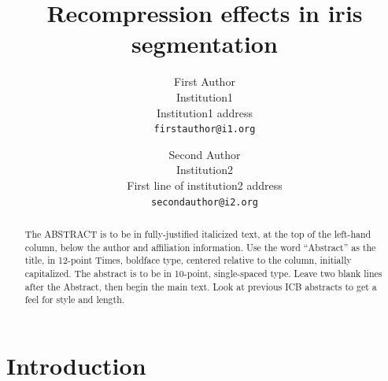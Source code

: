 \documentclass[10pt,twocolumn,letterpaper]{article}
\begin{document}
\title{Recompression effects in iris segmentation}

\author{First Author\\
Institution1\\
Institution1 address\\
{\tt\small firstauthor@i1.org}
\and
Second Author\\
Institution2\\
First line of institution2 address\\
{\tt\small secondauthor@i2.org}
}






\maketitle
\thispagestyle{empty}

\begin{abstract}
   The ABSTRACT is to be in fully-justified italicized text, at the top
   of the left-hand column, below the author and affiliation
   information. Use the word ``Abstract'' as the title, in 12-point
   Times, boldface type, centered relative to the column, initially
   capitalized. The abstract is to be in 10-point, single-spaced type.
   Leave two blank lines after the Abstract, then begin the main text.
   Look at previous ICB abstracts to get a feel for style and length. 
\end{abstract}

\section{Introduction}
\end{document}

